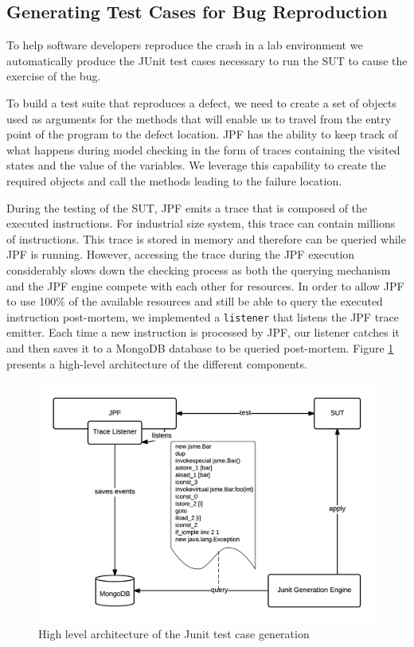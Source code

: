 \documentclass[times]{smrauth}
\begin{document}
\subsection{Generating Test Cases for Bug Reproduction}

To help software developers reproduce the crash in a lab
environment we automatically produce the JUnit test cases
necessary to run the SUT to cause the exercise of the bug.

To build a test suite that reproduces a defect, we need to create
a set of objects used as arguments for the methods that will
enable us to travel from the entry point of the program to the
defect location. JPF has the ability to keep track of what
happens during model checking in the form of traces
containing the visited states and the value of the variables. We
leverage this capability to create the required objects and call
the methods leading to the failure location.

During the testing of the SUT, JPF emits a trace that is composed of the executed instructions. 
For industrial size system, this trace can contain millions of instructions. This trace is stored in memory and therefore can be queried while JPF is running. 
However, accessing the trace during the JPF execution considerably slows down the checking process as both the querying mechanism and the JPF engine compete with each other for resources. 
In order to allow JPF to use 100\% of the available resources and still be able to query the executed instruction post-mortem, we implemented a {\tt listener} that listens the JPF trace emitter. 
Each time a new instruction is processed by JPF, our listener catches it and then saves it to a MongoDB database to be queried post-mortem. Figure \ref{fig:jcharming-unittest} presents a high-level architecture of the different components.

\begin{figure}[h!]
  \centering
    \includegraphics[scale=0.8]{media/unittest.png}
    \caption{High level architecture of the Junit test case generation
    \label{fig:jcharming-unittest}}
\end{figure}
\end{document}
